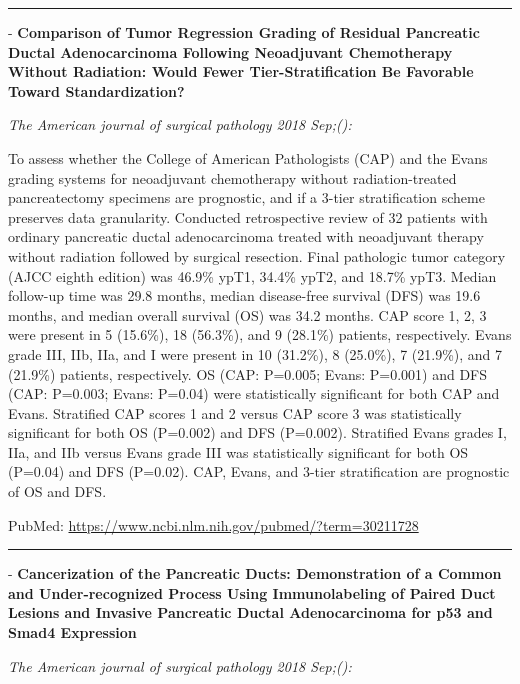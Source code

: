 \documentclass[]{article}
\begin{document}
\begin{center}\rule{0.5\linewidth}{\linethickness}\end{center}

 - \textbf{Comparison of Tumor Regression Grading of Residual Pancreatic
Ductal Adenocarcinoma Following Neoadjuvant Chemotherapy Without
Radiation: Would Fewer Tier-Stratification Be Favorable Toward
Standardization?}

\emph{The American journal of surgical pathology 2018 Sep;():}

To assess whether the College of American Pathologists (CAP) and the
Evans grading systems for neoadjuvant chemotherapy without
radiation-treated pancreatectomy specimens are prognostic, and if a
3-tier stratification scheme preserves data granularity. Conducted
retrospective review of 32 patients with ordinary pancreatic ductal
adenocarcinoma treated with neoadjuvant therapy without radiation
followed by surgical resection. Final pathologic tumor category (AJCC
eighth edition) was 46.9\% ypT1, 34.4\% ypT2, and 18.7\% ypT3. Median
follow-up time was 29.8 months, median disease-free survival (DFS) was
19.6 months, and median overall survival (OS) was 34.2 months. CAP score
1, 2, 3 were present in 5 (15.6\%), 18 (56.3\%), and 9 (28.1\%)
patients, respectively. Evans grade III, IIb, IIa, and I were present in
10 (31.2\%), 8 (25.0\%), 7 (21.9\%), and 7 (21.9\%) patients,
respectively. OS (CAP: P=0.005; Evans: P=0.001) and DFS (CAP: P=0.003;
Evans: P=0.04) were statistically significant for both CAP and Evans.
Stratified CAP scores 1 and 2 versus CAP score 3 was statistically
significant for both OS (P=0.002) and DFS (P=0.002). Stratified Evans
grades I, IIa, and IIb versus Evans grade III was statistically
significant for both OS (P=0.04) and DFS (P=0.02). CAP, Evans, and
3-tier stratification are prognostic of OS and DFS.

PubMed: \url{https://www.ncbi.nlm.nih.gov/pubmed/?term=30211728}

{}

{}

\begin{center}\rule{0.5\linewidth}{\linethickness}\end{center}

 - \textbf{Cancerization of the Pancreatic Ducts: Demonstration of a
Common and Under-recognized Process Using Immunolabeling of Paired Duct
Lesions and Invasive Pancreatic Ductal Adenocarcinoma for p53 and Smad4
Expression}

\emph{The American journal of surgical pathology 2018 Sep;():}
\end{document}

